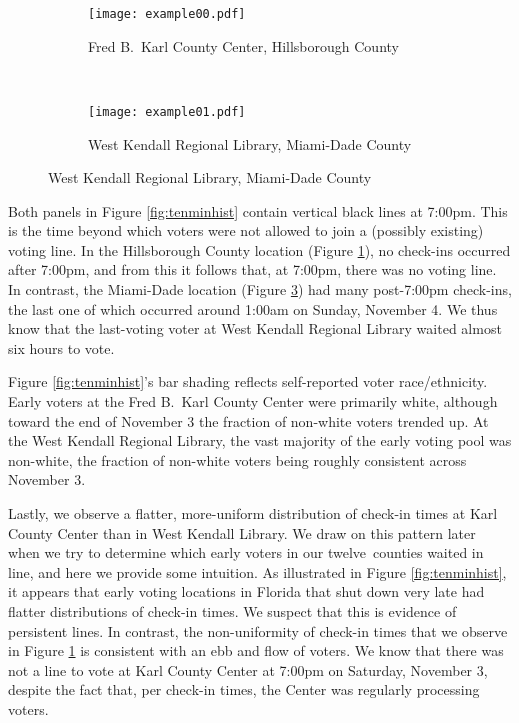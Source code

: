 \documentclass[12pt,titlepage]{article}
\newcommand{\numcounties}{twelve}
\begin{document}
\begin{figure}[!ht]
  \caption{Early voting check-in times on Saturday, November 3, 2012,
    in two locations}
  \label{fig:tenminhist}
  \centering
  \begin{subfigure}[b]{\linewidth}
    \centering\texttt{[image: example00.pdf]}
    \caption{Fred B.\ Karl County Center, Hillsborough County}
    \label{fig:karlexample}
  \end{subfigure}%
  \\
  \begin{subfigure}[b]{\linewidth}
    \centering\texttt{[image: example01.pdf]}
    \caption{West Kendall Regional Library, Miami-Dade County}
    \label{fig:kendallexample}
  \end{subfigure}
\end{figure}

Both panels in Figure \ref{fig:tenminhist} contain vertical black
lines at 7:00pm. This is the time beyond which voters were not allowed
to join a (possibly existing) voting line. In the Hillsborough County
location (Figure \ref{fig:karlexample}), no check-ins occurred after
7:00pm, and from this it follows that, at 7:00pm, there was no voting
line. In contrast, the Miami-Dade location (Figure
\ref{fig:kendallexample}) had many post-7:00pm check-ins, the last one
of which occurred around 1:00am on Sunday, November 4. We thus know
that the last-voting voter at West Kendall Regional Library waited
almost six hours to vote.

Figure \ref{fig:tenminhist}'s bar shading reflects self-reported voter
race/ethnicity. Early voters at the Fred B.\ Karl County Center were
primarily white, although toward the end of November 3 the fraction of
non-white voters trended up. At the West Kendall Regional Library, the
vast majority of the early voting pool was non-white, the fraction of
non-white voters being roughly consistent across November 3.

Lastly, we observe a flatter, more-uniform distribution of check-in
times at Karl County Center than in West Kendall Library. We draw on
this pattern later when we try to determine which early voters in our
\numcounties\ counties waited in line, and here we provide some
intuition. As illustrated in Figure \ref{fig:tenminhist}, it appears
that early voting locations in Florida that shut down very late had
flatter distributions of check-in times. We suspect that this is
evidence of persistent lines. In contrast, the non-uniformity of
check-in times that we observe in Figure \ref{fig:karlexample} is
consistent with an ebb and flow of voters. We know that there was not
a line to vote at Karl County Center at 7:00pm on Saturday, November
3, despite the fact that, per check-in times, the Center was regularly
processing voters.
\end{document}
